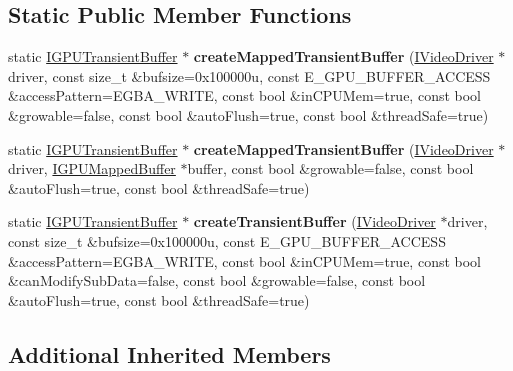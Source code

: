 \subsection*{Static Public Member Functions}
\begin{DoxyCompactItemize}
\item 
static \hyperlink{classirr_1_1video_1_1IGPUTransientBuffer}{I\+G\+P\+U\+Transient\+Buffer} $\ast$ {\bfseries create\+Mapped\+Transient\+Buffer} (\hyperlink{classirr_1_1video_1_1IVideoDriver}{I\+Video\+Driver} $\ast$driver, const size\+\_\+t \&bufsize=0x100000u, const E\+\_\+\+G\+P\+U\+\_\+\+B\+U\+F\+F\+E\+R\+\_\+\+A\+C\+C\+E\+S\+S \&access\+Pattern=\+E\+G\+B\+A\+\_\+\+W\+R\+I\+T\+E, const bool \&in\+C\+P\+U\+Mem=true, const bool \&growable=false, const bool \&auto\+Flush=true, const bool \&thread\+Safe=true)\hypertarget{classirr_1_1video_1_1IGPUTransientBuffer_a86dcc22d24ca78f6823eee14b883196f}{}\label{classirr_1_1video_1_1IGPUTransientBuffer_a86dcc22d24ca78f6823eee14b883196f}

\item 
static \hyperlink{classirr_1_1video_1_1IGPUTransientBuffer}{I\+G\+P\+U\+Transient\+Buffer} $\ast$ {\bfseries create\+Mapped\+Transient\+Buffer} (\hyperlink{classirr_1_1video_1_1IVideoDriver}{I\+Video\+Driver} $\ast$driver, \hyperlink{classirr_1_1video_1_1IGPUMappedBuffer}{I\+G\+P\+U\+Mapped\+Buffer} $\ast$buffer, const bool \&growable=false, const bool \&auto\+Flush=true, const bool \&thread\+Safe=true)\hypertarget{classirr_1_1video_1_1IGPUTransientBuffer_a1c150de3ed0a5dac854fbb03a4d173c9}{}\label{classirr_1_1video_1_1IGPUTransientBuffer_a1c150de3ed0a5dac854fbb03a4d173c9}

\item 
static \hyperlink{classirr_1_1video_1_1IGPUTransientBuffer}{I\+G\+P\+U\+Transient\+Buffer} $\ast$ {\bfseries create\+Transient\+Buffer} (\hyperlink{classirr_1_1video_1_1IVideoDriver}{I\+Video\+Driver} $\ast$driver, const size\+\_\+t \&bufsize=0x100000u, const E\+\_\+\+G\+P\+U\+\_\+\+B\+U\+F\+F\+E\+R\+\_\+\+A\+C\+C\+E\+S\+S \&access\+Pattern=\+E\+G\+B\+A\+\_\+\+W\+R\+I\+T\+E, const bool \&in\+C\+P\+U\+Mem=true, const bool \&can\+Modify\+Sub\+Data=false, const bool \&growable=false, const bool \&auto\+Flush=true, const bool \&thread\+Safe=true)\hypertarget{classirr_1_1video_1_1IGPUTransientBuffer_ad3271733fe1db3ac1fd03dd6b2732018}{}\label{classirr_1_1video_1_1IGPUTransientBuffer_ad3271733fe1db3ac1fd03dd6b2732018}

\end{DoxyCompactItemize}
\subsection*{Additional Inherited Members}


